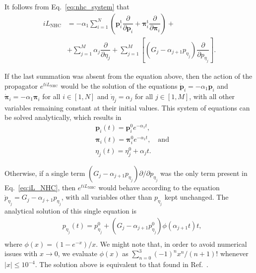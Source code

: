 \documentclass[aip,jcp,reprint,amsmath,amssymb]{revtex4-1}
\newcommand{\vt}[1]{\boldsymbol{\mathbf{#1}}}           %
\newcommand{\tr}[1]{#1^\text{t}}                        %
\newcommand{\diff}[2]{\dfrac{\partial #1}{\partial #2}} %
\begin{document}
It follows from Eq.~\ref{eq:nhc_system} that
\begin{equation}
\label{eq:iL_NHC}
\begin{split}
i\!L_\text{NHC} &= -\alpha_1 \sum_{i=1}^N \left( \tr{\vt p}_i \diff{}{\vt p_i} + \tr{\vt \pi}_i \diff{}{\vt \pi_i}\right) + \\
&+ \sum_{j=1}^M \alpha_j \diff{}{\eta_j} + \sum_{j=1}^M \left[ (G_j - \alpha_{j+1} p_{\eta_j}) \diff{}{p_{\eta_j}} \right].
\end{split}
\end{equation}

If the last summation was absent from the equation above, then the action of the propagator $e^{t i\!L_\text{NHC}}$ would be the solution of the equations $\dot{\vt p}_i = -\alpha_1 \vt p_i$ and $\dot{\vt \pi}_i = -\alpha_1 \vt \pi_i$ for all $i \in [1,N]$ and $\dot{\eta}_j = \alpha_j$ for all $j \in [1,M]$, with all other variables remaining constant at their initial values. This system of equations can be solved analytically, which results in
\begin{subequations}
\begin{align}
&\vt p_i(t) = \vt p_i^0 e^{-\alpha_1 t}, \\
&\vt \pi_i(t) = \vt \pi_i^0 e^{-\alpha_1 t}, \quad \text{and}\\
&\eta_j(t) = \eta_j^0 + \alpha_j t. \label{eq:solution_eta}
\end{align}
\end{subequations}

Otherwise, if a single term $(G_j - \alpha_{j+1} p_{\eta_j}) \partial/\partial p_{\eta_j}$ was the only term present in Eq.~\ref{eq:iL_NHC}, then $e^{t i\!L_\text{NHC}}$ would behave according to the equation $\dot{p}_{\eta_j} = G_j - \alpha_{j+1} p_{\eta_j}$, with all variables other than $p_{\eta_j}$ kept unchanged. The analytical solution of this single equation is
\begin{equation}
\label{eq:solution_p_eta}
\begin{split}
&p_{\eta_j}(t) = p_{\eta_j}^0 + \left( G_j - \alpha_{j+1} p_{\eta_j}^0 \right) \phi\left(\alpha_{j+1} t\right) t, \\
\end{split}
\end{equation}
where $\phi(x) = (1-e^{-x})/x$. We might note that, in order to avoid numerical issues with $x \rightarrow 0$, we evaluate $\phi(x)$ as $\sum_{n=0}^3 {(-1)^n x^n}/{(n+1)!}$ whenever $|x| \leq 10^{-4}$. The solution above is equivalent to that found in Ref.~.
\end{document}
